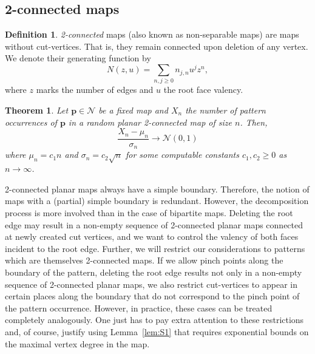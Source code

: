 \documentclass[reqno, 11pt]{amsart}
\newtheorem{theorem}{Theorem}
\theoremstyle{definition}
\newtheorem{definition}{Definition}
\theoremstyle{remark}
\newcommand{\map}[1]{\textbf{#1}}
\numberwithin{equation}{section}
\begin{document}
\subsection{2-connected maps}

\begin{definition}\label{def:classes} 
    \emph{2-connected} maps (also known as non-separable maps) are maps without cut-vertices. That is, they remain connected upon deletion of any vertex. We denote their generating function by
        \[
            N(z,u) = \sum_{n,j\geq 0} n_{j,n}u^jz^n,
        \]
    where $z$ marks the number of edges and $u$ the root face valency.
\end{definition}

\begin{theorem}\label{thm:clt_nonsep}
    Let $\map{p} \in \mathcal{N}$ be a fixed map and $X_n$ the number of pattern occurrences of $\map{p}$ in a random planar 2-connected map of size $n$. Then,
    \[
        \frac{X_n-\mu_n}{\sigma_n} \rightarrow \mathcal{N}(0,1)
    \]
    where $\mu_n = c_1n$ and $\sigma_n = c_2\sqrt{n}$ for some computable constants $c_1,c_2 \geq 0$  as $n\rightarrow \infty$.
\end{theorem}


2-connected planar maps always have a simple boundary. Therefore, the notion of maps with a (partial) simple boundary is redundant. However, the decomposition process is more involved than in the case of bipartite maps. Deleting the root edge may result in a non-empty sequence of 2-connected planar maps connected at newly created cut vertices, and we want to control the valency of both faces incident to the root edge. Further, we will restrict our considerations to patterns which are themselves 2-connected maps. If we allow pinch points along the boundary of the pattern, deleting the root edge results not only in a non-empty sequence of 2-connected planar maps, we also restrict cut-vertices to appear in certain places along the boundary that do not correspond to the pinch point of the pattern occurrence. However, in practice, these cases can be treated completely analogously. One just has to pay extra attention to these restrictions and, of course, justify using Lemma~\ref{lem:S1} that requires exponential bounds on the maximal vertex degree in the map. 
\end{document}
